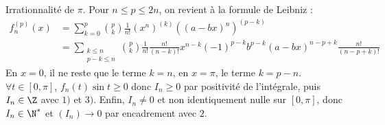 \documentclass[11pt]{article}
\begin{document}
\begin{exercice}{Irrationnalité de $\pi$.}{}
    Pour $n\leq p \leq 2n$, on revient à la formule de Leibniz :
    \begin{align*}
        f_n^{(p)}(x)&=\sum_{k=0}^p\binom{p}{k}\frac{1}{n!}(x^n)^{(k)}((a-bx)^n)^{(p-k)}\\
        &=\sum_{\substack{k\leq n\\ p-k\leq n}}\binom{p}{k}\frac{1}{n!}\frac{n!}{(n-k)!}x^{n-k}(-1)^{p-k}b^{p-k}(a-bx)^{n-p+k}\frac{n!}{(n-p+k)!}
    \end{align*}
    En $x=0$, il ne reste que le terme $k=n$, en $x=\pi$, le terme $k=p-n$.\\
     $\forall t \in [0,\pi]$, $f_n(t)\sin t\geq0$ donc $I_n\geq0$ par positivité de l'intégrale, puis $I_n\in\Z$ avec $1)$ et $3)$. Enfin, $I_n\neq0$ et non identiquement nulle sur $[0,\pi]$, donc $I_n\in\N^*$ et $(I_n)\to0$ par encadrement avec $2.$
\end{exercice}
\end{document}
